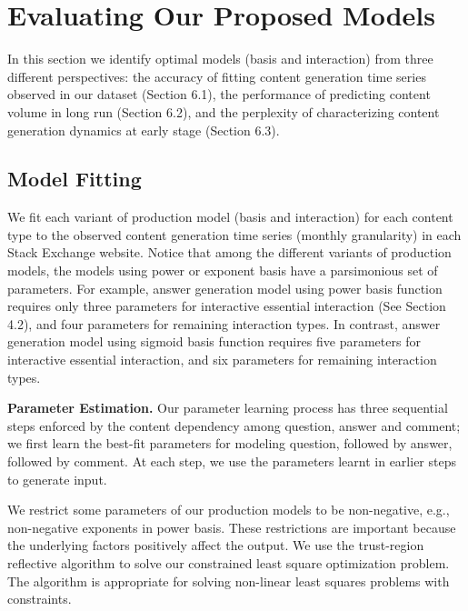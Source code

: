 \section{Evaluating Our Proposed Models}
In this section we identify optimal models (basis and interaction) from three different perspectives: the accuracy of fitting content generation time series observed in our dataset (Section 6.1), the performance of predicting content volume in long run (Section 6.2), and the perplexity of characterizing content generation dynamics at early stage (Section 6.3).

\subsection{Model Fitting}
We fit each variant of production model (basis and interaction) for each content type to the observed content generation time series (monthly granularity) in each Stack Exchange website. Notice that among the different variants of production models, the models using power or exponent basis have a parsimonious set of parameters. For example, answer generation model using power basis function requires only three parameters for interactive essential interaction (See Section 4.2), and four parameters for remaining interaction types. In contrast, answer generation model using sigmoid basis function requires five parameters for interactive essential interaction, and six parameters for remaining interaction types. 

\textbf{Parameter Estimation.} Our parameter learning process has three sequential steps enforced by the content dependency among question, answer and comment; we first learn the best-fit parameters for modeling question, followed by answer, followed by comment. At each step, we use the parameters learnt in earlier steps to generate input.

We restrict some parameters of our production models to be non-negative, e.g., non-negative exponents in power basis. These restrictions are important because the underlying factors positively affect the output. We use the trust-region reflective algorithm to solve our constrained least square optimization problem. The algorithm is appropriate for solving non-linear least squares problems with constraints.

